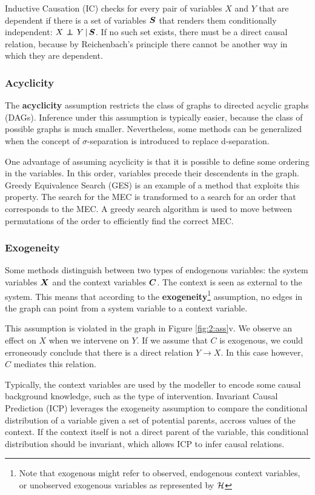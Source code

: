 Inductive Causation (IC) checks for every pair of variables $X$ and $Y$ that are dependent if there is a set of variables $\bm{S}$ that renders them conditionally independent: ${X} \operatorname*{{\,\perp\mkern-12mu\perp\,}}_{} {Y} \,|\, {\bm{S}}$. If no such set exists, there must be a direct causal relation, because by Reichenbach's principle there cannot be another way in which they are dependent.

\subsubsection{Acyclicity}

The \textbf{acyclicity} assumption restricts the class of graphs to directed acyclic graphs (DAGs). Inference under this assumption is typically easier, because the class of possible graphs is much smaller. Nevertheless, some methods can be generalized when the concept of $\sigma$-separation is introduced to replace d-separation. 

One advantage of assuming acyclicity is that it is possible to define some ordering in the variables. In this order, variables precede their descendents in the graph. Greedy Equivalence Search (GES) is an example of a method that exploits this property. The search for the MEC is transformed to a search for an order that corresponds to the MEC. A greedy search algorithm is used to move between permutations of the order to efficiently find the correct MEC. 

\subsubsection{Exogeneity}

Some methods distinguish between two types of endogenous variables: the system variables $\bm{X}$ and the context variables $\bm{C}$. The context is seen as external to the system. This means that according to the \textbf{exogeneity}\footnote{Note that exogenous might refer to observed, endogenous context variables, or unobserved exogenous variables as represented by $\mathcal{H}$} assumption, no edges in the graph can point from a system variable to a context variable. 

This assumption is violated in the graph in Figure \ref{fig:2:ass}v. We observe an effect on $X$ when we intervene on $Y$. If we assume that $C$ is exogenous, we could erroneously conclude that there is a direct relation $Y\to X$. In this case however, $C$ mediates this relation.

Typically, the context variables are used by the modeller to encode some causal background knowledge, such as the type of intervention. Invariant Causal Prediction (ICP) leverages the exogeneity assumption to compare the conditional distribution of a variable given a set of potential parents, accross values of the context. If the context itself is not a direct parent of the variable, this conditional distribution should be invariant, which allows ICP to infer causal relations. 


\label{sec:back:meth}
